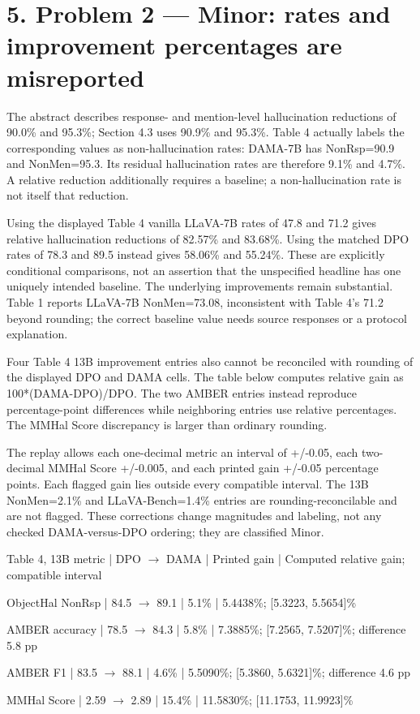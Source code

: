 \documentclass[10pt]{article}
\begin{document}
\section*{5. Problem 2 — Minor: rates and improvement percentages are misreported}
The abstract describes response- and mention-level hallucination reductions of 90.0\% and 95.3\%; Section 4.3 uses 90.9\% and 95.3\%. Table 4 actually labels the corresponding values as non-hallucination rates: DAMA-7B has NonRsp=90.9 and NonMen=95.3. Its residual hallucination rates are therefore 9.1\% and 4.7\%. A relative reduction additionally requires a baseline; a non-hallucination rate is not itself that reduction.\par
Using the displayed Table 4 vanilla LLaVA-7B rates of 47.8 and 71.2 gives relative hallucination reductions of 82.57\% and 83.68\%. Using the matched DPO rates of 78.3 and 89.5 instead gives 58.06\% and 55.24\%. These are explicitly conditional comparisons, not an assertion that the unspecified headline has one uniquely intended baseline. The underlying improvements remain substantial. Table 1 reports LLaVA-7B NonMen=73.08, inconsistent with Table 4’s 71.2 beyond rounding; the correct baseline value needs source responses or a protocol explanation.\par
Four Table 4 13B improvement entries also cannot be reconciled with rounding of the displayed DPO and DAMA cells. The table below computes relative gain as 100*(DAMA-DPO)/DPO. The two AMBER entries instead reproduce percentage-point differences while neighboring entries use relative percentages. The MMHal Score discrepancy is larger than ordinary rounding.\par
The replay allows each one-decimal metric an interval of +/-0.05, each two-decimal MMHal Score +/-0.005, and each printed gain +/-0.05 percentage points. Each flagged gain lies outside every compatible interval. The 13B NonMen=2.1\% and LLaVA-Bench=1.4\% entries are rounding-reconcilable and are not flagged. These corrections change magnitudes and labeling, not any checked DAMA-versus-DPO ordering; they are classified Minor.\par
Table 4, 13B metric | DPO \(\rightarrow\) DAMA | Printed gain | Computed relative gain; compatible interval\par
ObjectHal NonRsp | 84.5 \(\rightarrow\) 89.1 | 5.1\% | 5.4438\%; [5.3223, 5.5654]\%\par
AMBER accuracy | 78.5 \(\rightarrow\) 84.3 | 5.8\% | 7.3885\%; [7.2565, 7.5207]\%; difference 5.8 pp\par
AMBER F1 | 83.5 \(\rightarrow\) 88.1 | 4.6\% | 5.5090\%; [5.3860, 5.6321]\%; difference 4.6 pp\par
MMHal Score | 2.59 \(\rightarrow\) 2.89 | 15.4\% | 11.5830\%; [11.1753, 11.9923]\%\par
\end{document}
